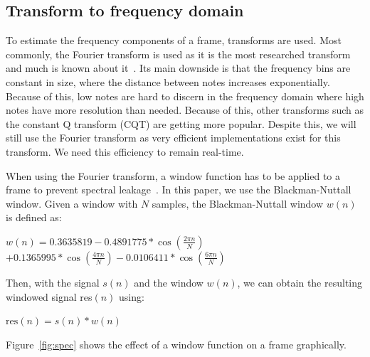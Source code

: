 \documentclass[10pt,twocolumn]{article}
\begin{document}
\subsection{Transform to frequency domain}
To estimate the frequency components of a frame, transforms are used. Most commonly, the Fourier transform is used as it is the most researched transform and much is known about it~\cite{survey2}. Its main downside is that the frequency bins are constant in size, where the distance between notes increases exponentially. Because of this, low notes are hard to discern in the frequency domain where high notes have more resolution than needed. Because of this, other transforms such as the constant Q transform (CQT) are getting more popular. Despite this, we will still use the Fourier transform as very efficient implementations exist for this transform. We need this efficiency to remain real-time.

When using the Fourier transform, a window function has to be applied to a frame to prevent spectral leakage~\cite{window}. In this paper, we use the Blackman-Nuttall window. Given a window with $N$ samples, the Blackman-Nuttall window $w(n)$ is defined as:\vspace{-1mm}
\begin{center}
    \hspace{-12mm} $w(n) = 0.3635819 - 0.4891775*\cos(\frac{2\pi n}{N})$ \\\vspace{+0.5mm}
    \hspace{+4mm} $+ 0.1365995 * \cos(\frac{4\pi n}{N}) - 0.0106411 * \cos(\frac{6\pi n}{N})$
\end{center}%
Then, with the signal $s(n)$ and the window $w(n)$, we can obtain the resulting windowed signal res$(n)$ using:
\begin{center}%
    $\text{res}(n) = s(n) * w(n)$
\end{center}
Figure~\ref{fig:spec} shows the effect of a window function on a frame graphically.
\end{document}
